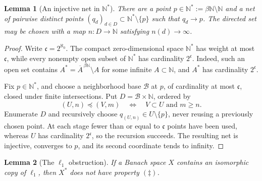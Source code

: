\documentclass[11pt]{article}
\newtheorem{lemma}{Lemma}
\newcommand{\N}{\mathbb N}
\begin{document}
\begin{lemma}[An injective net in \(\N^*\)]\label{lem:net}
There are a point \(p\in\N^*:=\beta\N\setminus\N\) and a net of pairwise
distinct points \((q_d)_{d\in D}\subset\N^*\setminus\{p\}\) such that
\(q_d\to p\).  The directed set may be chosen with a map
\(n:D\to\N\) satisfying \(n(d)\to\infty\).
\end{lemma}

\begin{proof}
Write \(\mathfrak c=2^{\aleph_0}\).  The compact zero-dimensional space
\(\N^*\) has weight at most \(\mathfrak c\), while every nonempty open subset
of \(\N^*\) has cardinality \(2^{\mathfrak c}\).  Indeed, such an open set
contains \(A^*=\overline A^{\,\beta\N}\setminus A\) for some infinite
\(A\subset\N\), and \(A^*\) has cardinality \(2^{\mathfrak c}\).

Fix \(p\in\N^*\), and choose a neighborhood base \(\mathcal B\) at \(p\), of
cardinality at most \(\mathfrak c\), closed under finite intersections.  Put
\(D=\mathcal B\times\N\), ordered by
\[
 (U,n)\preceq(V,m)\quad\Longleftrightarrow\quad V\subset U\text{ and }m\geq n.
\]
Enumerate \(D\) and recursively choose
\(q_{(U,n)}\in U\setminus\{p\}\), never reusing a previously chosen point.
At each stage fewer than or equal to \(\mathfrak c\) points have been used,
whereas \(U\) has cardinality \(2^{\mathfrak c}\), so the recursion succeeds.
The resulting net is injective, converges to \(p\), and its second coordinate
tends to infinity.
\end{proof}

\begin{lemma}[The \(\ell_1\) obstruction]\label{lem:l1}
If a Banach space \(X\) contains an isomorphic copy of \(\ell_1\), then
\(X^*\) does not have property \((\ddagger)\).
\end{lemma}
\end{document}
